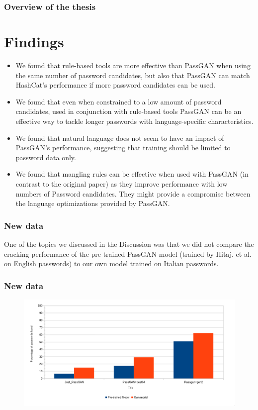 \documentclass{beamer}
\begin{document}
\begin{frame}
\frametitle{Overview of the thesis}
\section{Findings}
\begin{itemize}
    \item We found that rule-based tools are more effective than PassGAN when using the same number of password candidates, but also that PassGAN can match HashCat's performance if more password candidates can be used.
    \item We found that even when constrained to a low amount of password candidates, used in conjunction with rule-based tools PassGAN can be an effective way to tackle longer passwords with language-specific characteristics.
    \item We found that natural language does not seem to have an impact of PassGAN's performance, suggesting that training should be limited to password data only. 
    \item We found that mangling rules can be effective when used with PassGAN (in contrast to the original paper) as they improve performance with low numbers of Password candidates.
They might provide a compromise between the language optimizations provided by PassGAN.
\end{itemize}

\end{frame}

\begin{frame}
\frametitle{New data}

One of the topics we discussed in the Discussion was that we did not compare the cracking performance of the pre-trained PassGAN model (trained by Hitaj. et al. on English passwords) to our own model trained on Italian passwords.
\end{frame}

\begin{frame}
\frametitle{New data}
\begin{figure}[H]
\centering
    \includegraphics[scale=0.30]{chart.png}
\end{figure}
\end{frame}    
\end{document}
